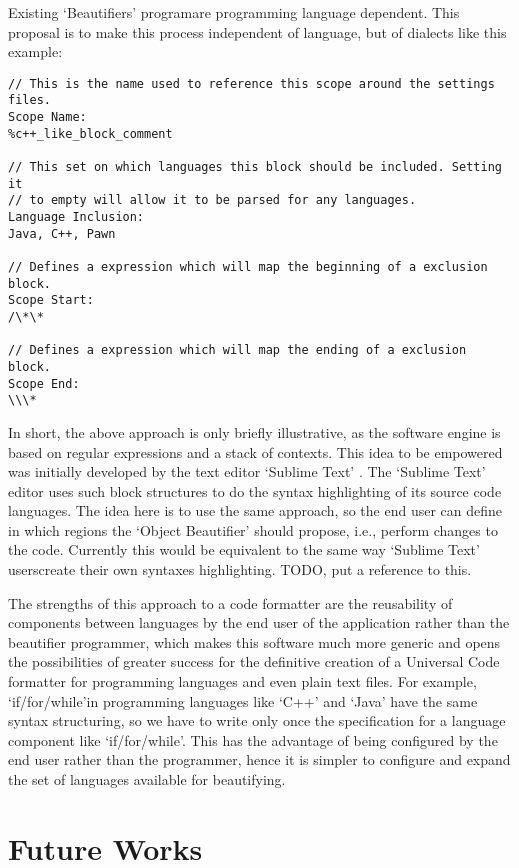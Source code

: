 Existing `Beautifiers' program\s are programming language dependent.
This proposal is to make this process independent of language,
but of dialects like this example:

\begin{lstlisting}
// This is the name used to reference this scope around the settings files.
Scope Name:
%c++_like_block_comment

// This set on which languages this block should be included. Setting it
// to empty will allow it to be parsed for any languages.
Language Inclusion:
Java, C++, Pawn

// Defines a expression which will map the beginning of a exclusion block.
Scope Start:
/\*\*

// Defines a expression which will map the ending of a exclusion block.
Scope End:
\\\*
\end{lstlisting}
\vspace*{-4mm}

In short,
the above approach is only briefly illustrative,
as the software engine is based on regular expressions and a stack of contexts.
This idea to be empowered was initially developed by the text editor `Sublime Text' \cite{Skinner}.
The `Sublime Text' editor uses such block structures to do the syntax highlighting of its source code languages.
The idea here is to use the same approach,
so the end user can define in which regions the `Object Beautifier' should propose, i.e.,
perform changes to the code.
Currently this would be equivalent to the same way `Sublime Text' users\q create their own syntaxes highlighting.
TODO,
put a reference to this.

The strengths of this approach to a code formatter are the reusability of components between languages by the end
user of the application rather than the beautifier programmer,
which makes this software much more generic and opens the possibilities of greater success for the definitive
creation of a Universal Code formatter for programming languages and even plain text files.
For example,
`if/for/while'\q in programming languages like `C++' and `Java' have the same syntax structuring,
so we have to write only once the specification for a language component like `if/for/while'\q.
This has the advantage of being configured by the end user rather than the programmer,
hence it is simpler to configure and expand the set of languages available for beautifying.


\section{Future Works}

